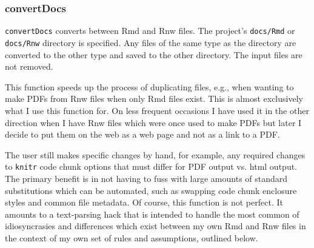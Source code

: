 \documentclass{article}\usepackage[]{graphicx}\usepackage[]{color}
\begin{document}
\title{}
\author{}
\maketitle





\subsubsection{convertDocs}
\texttt{convertDocs} converts between Rmd and Rnw files.
The project's \texttt{docs/Rmd} or \texttt{docs/Rnw} directory is specified.
Any files of the same type as the directory are converted to the other type and saved to the other directory.
The input files are not removed.

This function speeds up the process of duplicating files, e.g., when wanting to make PDFs from Rnw files when only Rmd files exist.
This is almost exclusively what I use this function for.
On less frequent occasions I have used it in the other direction when I have Rnw files which were once used to make PDFs but later I decide to put them on the web as a web page and not as a link to a PDF.

The user still makes specific changes by hand, for example, any required changes to \texttt{knitr} code chunk options that must differ for PDF output vs. html output.
The primary benefit is in not having to fuss with large amounts of standard substitutions which can be automated, such as swapping code chunk enclosure styles and common file metadata.
Of course, this function is not perfect.
It amounts to a text-parsing hack that is intended to handle the most common of idiosyncrasies and differences which exist between my own Rmd and Rnw files in the context of my own set of rules and assumptions, outlined below.
\end{document}
